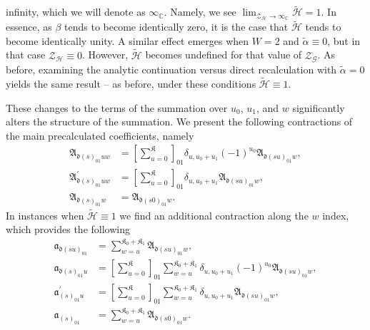 infinity, which we will denote as $\infty_{\mathbb{C}}$. Namely, we see $
\lim_{\mathcal{Z}_{\mathcal{H}}\rightarrow\infty_{\mathbb{C}}}
\tilde{\mathcal{H}} = 1 $. In essence, as $\beta$ tends to become identically
zero, it is the case that $\tilde{\mathcal{H}}$ tends to become identically
unity. A similar effect emerges when $W = 2$ and $\tilde{\alpha} \equiv 0$, but
in that case $\mathcal{Z}_{\mathcal{H}} \equiv 0$. However,
$\tilde{\mathcal{H}}$ becomes undefined for that value of
$\mathcal{Z}_{\mathcal{G}}$. As before, examining the analytic continuation
versus direct recalculation with $\tilde{\alpha} = 0$ yields the same result --
as before, under these conditions $\tilde{\mathcal{H}} \equiv 1$.

These changes to the terms of the summation over $u_{0}$, $u_{1}$, and $w$
significantly alters the structure of the summation. We present the following
contractions of the main precalculated coefficients, namely
\begin{align}
\mathfrak{A}_{\mathfrak{d}\left(s\right)_{01}uw}
    &=
        \left[ \sum_{u=0}^{\mathfrak{K}} \right]_{01}
        \delta_{u,u_{0}+u_{1}}
        \left(-1\right)^{u_{0}}
        \mathfrak{A}_{\mathfrak{d}\left(su\right)_{01}w}
,\\
\mathfrak{A}_{\mathfrak{d}\left(s\right)_{01}uw}^{\prime}
    &=
        \left[ \sum_{u=0}^{\mathfrak{K}} \right]_{01}
        \delta_{u,u_{0}+u_{1}}
        \mathfrak{A}_{\mathfrak{d}\left(su\right)_{01}w}
,\\
\mathfrak{A}_{\mathfrak{d}\left(s\right)_{01}w}
    &=
        \mathfrak{A}_{\mathfrak{d}\left(s0\right)_{01}w}
.
\end{align}
In instances when $\tilde{\mathcal{H}} \equiv 1$ we find an additional
contraction along the $w$ index, which provides the following
\begin{align}
    \mathfrak{a}_{\mathfrak{d}\left(su\right)_{01}}
        &=
            \sum_{w=u}^{\mathfrak{K}_{0}+\mathfrak{K}_{1}}
            \mathfrak{A}_{\mathfrak{d}\left(su\right)_{01}w}
    ,\\
    \mathfrak{a}_{\mathfrak{d}\left(s\right)_{01}u}
        &=
            \left[ \sum_{u=0}^{\mathfrak{K}} \right]_{01}
            \sum_{w=u}^{\mathfrak{K}_{0}+\mathfrak{K}_{1}}
            \delta_{u,u_{0}+u_{1}}
            \left(-1\right)^{u_{0}}
            \mathfrak{A}_{\mathfrak{d}\left(su\right)_{01}w}
    ,\\
    \mathfrak{a}_{\left(s\right)_{01}u}^{\prime}
        &=
            \left[ \sum_{u=0}^{\mathfrak{K}} \right]_{01}
            \sum_{w=u}^{\mathfrak{K}_{0}+\mathfrak{K}_{1}}
            \delta_{u,u_{0}+u_{1}}
            \mathfrak{A}_{\mathfrak{d}\left(su\right)_{01}w}
    ,\\
    \mathfrak{a}_{\left(s\right)_{01}}
        &=
            \sum_{w=u}^{\mathfrak{K}_{0}+\mathfrak{K}_{1}}
            \mathfrak{A}_{\mathfrak{d}\left(s0\right)_{01}w}
    .
\end{align}
